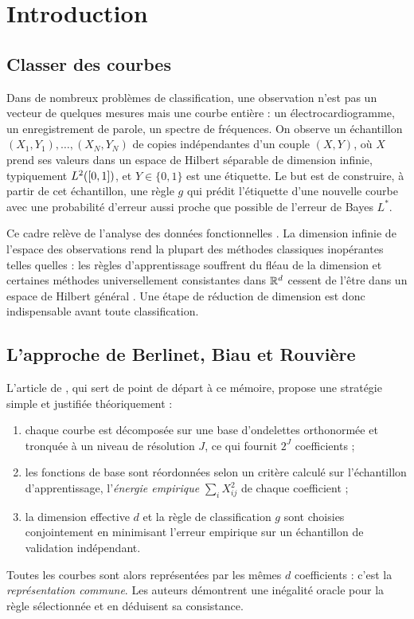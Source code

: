 \cleardoublepage

\tableofcontents
\cleardoublepage
{}

\chapter{Introduction}\label{chap-intro}

\section{Classer des courbes}

Dans de nombreux problèmes de classification, une observation n'est pas un vecteur de quelques mesures mais une courbe entière : un électrocardiogramme, un enregistrement de parole, un spectre de fréquences. On observe un échantillon $(X_1,Y_1),\dots,(X_N,Y_N)$ de copies indépendantes d'un couple $(X,Y)$, où $X$ prend ses valeurs dans un espace de Hilbert séparable de dimension infinie, typiquement $L^2([0,1])$, et $Y\in\{0,1\}$ est une étiquette. Le but est de construire, à partir de cet échantillon, une règle $g$ qui prédit l'étiquette d'une nouvelle courbe avec une probabilité d'erreur aussi proche que possible de l'erreur de Bayes $L^*$.

Ce cadre relève de l'analyse des données fonctionnelles \citep{ramsay2005functional,ferraty2006nonparametric}. La dimension infinie de l'espace des observations rend la plupart des méthodes classiques inopérantes telles quelles : les règles d'apprentissage souffrent du fléau de la dimension et certaines méthodes universellement consistantes dans $\mathbb{R}^d$ cessent de l'être dans un espace de Hilbert général \citep{abraham2006kernel,cerou2006nearest}. Une étape de réduction de dimension est donc indispensable avant toute classification.

\section{L'approche de Berlinet, Biau et Rouvière}

L'article de \citet{berlinet2008functional}, qui sert de point de départ à ce mémoire, propose une stratégie simple et justifiée théoriquement :
\begin{enumerate}
  \item chaque courbe est décomposée sur une base d'ondelettes orthonormée et tronquée à un niveau de résolution $J$, ce qui fournit $2^J$ coefficients ;
  \item les fonctions de base sont réordonnées selon un critère calculé sur l'échantillon d'apprentissage, l'\emph{énergie empirique} $\sum_i X_{ij}^2$ de chaque coefficient ;
  \item la dimension effective $d$ et la règle de classification $g$ sont choisies conjointement en minimisant l'erreur empirique sur un échantillon de validation indépendant.
\end{enumerate}
Toutes les courbes sont alors représentées par les mêmes $d$ coefficients : c'est la \emph{représentation commune}. Les auteurs démontrent une inégalité oracle pour la règle sélectionnée et en déduisent sa consistance.

